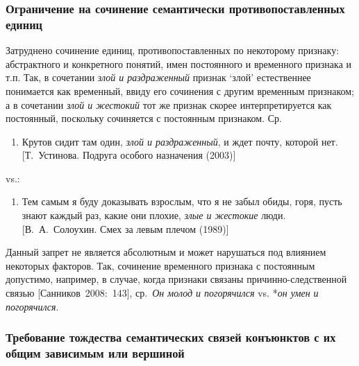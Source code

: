 \subsubsection{Ограничение на сочинение семантически противопоставленных
  единиц}\label{ux43eux433ux440ux430ux43dux438ux447ux435ux43dux438ux435-ux43dux430-ux441ux43eux447ux438ux43dux435ux43dux438ux435-ux441ux435ux43cux430ux43dux442ux438ux447ux435ux441ux43aux438-ux43fux440ux43eux442ux438ux432ux43eux43fux43eux441ux442ux430ux432ux43bux435ux43dux43dux44bux445-ux435ux434ux438ux43dux438ux446}

Затруднено сочинение единиц, противопоставленных по некоторому признаку:
абстрактного и конкретного понятий, имен постоянного и временного
признака и т.п. Так, в сочетании \textit{злой и раздраженный} признак
`злой' естественнее понимается как временный, ввиду его сочинения с
другим временным признаком; а в сочетании \textit{злой и жестокий} тот же
признак скорее интерпретируется как постоянный, поскольку сочиняется с
постоянным признаком. Ср.

\begin{enumerate}
  \def\labelenumi{(\arabic{enumi})}
  \setcounter{enumi}{14}
  \item
        Крутов сидит там один, \textit{злой и раздраженный}, и ждет почту,
        которой нет. {[}Т.~Устинова. Подруга особого назначения (2003){]}
\end{enumerate}

vs.:

\begin{enumerate}
  \def\labelenumi{(\arabic{enumi})}
  \setcounter{enumi}{15}
  \item
        Тем самым я буду доказывать взрослым, что я не забыл обиды, горя,
        пусть знают каждый раз, какие они плохие, \textit{злые и жестокие} люди.
        {[}В.~А.~Солоухин. Смех за левым плечом (1989){]}
\end{enumerate}

Данный запрет не является абсолютным и может нарушаться под влиянием
некоторых факторов. Так, сочинение временного признака с постоянным
допустимо, например, в случае, когда признаки связаны
причинно-следственной связью {[}Санников~2008:~143{]}, ср.~\textit{Он
  молод и погорячился} vs. *\textit{он умен и погорячился}.

\subsubsection{Требование тождества семантических связей конъюнктов с их
  общим зависимым или
  вершиной}\label{ux442ux440ux435ux431ux43eux432ux430ux43dux438ux435-ux442ux43eux436ux434ux435ux441ux442ux432ux430-ux441ux435ux43cux430ux43dux442ux438ux447ux435ux441ux43aux438ux445-ux441ux432ux44fux437ux435ux439-ux43aux43eux43dux44aux44eux43dux43aux442ux43eux432-ux441-ux438ux445-ux43eux431ux449ux438ux43c-ux437ux430ux432ux438ux441ux438ux43cux44bux43c-ux438ux43bux438-ux432ux435ux440ux448ux438ux43dux43eux439}

